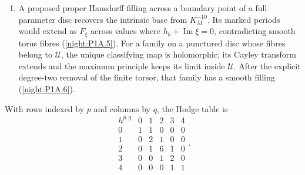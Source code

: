 \documentclass[11pt,a4paper]{article}
\theoremstyle{definition}
\begin{document}
\begin{enumerate}[label=\arabic*.]
  outside the component's rays $\pm(\{0,1\}^3\setminus\{0\})$.
  The corresponding monomial map contracts a divisor, contradicting
  a biholomorphism (\cref{night:P1.17}).
\item A proposed proper Hausdorff filling across a boundary point of
  a full parameter disc recovers the intrinsic base from $K_M^{-10}$.
  Its marked periods would extend as $F_\xi$ across values where
  $h_b+\operatorname{Im}\xi=0$, contradicting smooth torus fibres
  (\cref{night:P1A.5}).  For a family on a punctured disc whose
  fibres belong to $\mathcal U$, the unique classifying map is
  holomorphic; its Cayley transform extends and the maximum principle
  keeps its limit inside $\mathcal U$.  After the explicit degree-two
  removal of the finite torsor, that family has a smooth filling
  (\cref{night:P1A.6}).
\end{enumerate}

With rows indexed by $p$ and columns by $q$, the Hodge table is
\[
\begin{array}{c|ccccc}
 h^{p,q}&0&1&2&3&4\\\hline
 0&1&1&0&0&0\\
 1&0&2&1&0&0\\
 2&0&1&6&1&0\\
 3&0&0&1&2&0\\
 4&0&0&0&1&1
\end{array}.
\]
\end{document}
